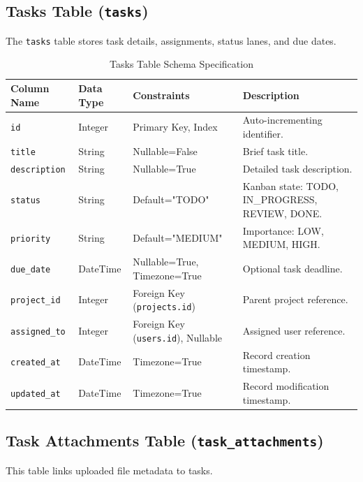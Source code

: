 \pagebreak
\subsection{Tasks Table (\texttt{tasks})}
The \texttt{tasks} table stores task details, assignments, status lanes, and due dates.

\begin{table}[h!]
\centering
\small
\renewcommand{\arraystretch}{1.4}
\begin{tabularx}{\textwidth}{l l l X}
    \toprule[1.5pt]
    \rowcolor{primary!5}
    \textbf{\color{primary}Column Name} & \textbf{\color{primary}Data Type} & \textbf{\color{primary}Constraints} & \textbf{\color{primary}Description} \\
    \midrule
    \texttt{id} & Integer & Primary Key, Index & Auto-incrementing identifier. \\
    \texttt{title} & String & Nullable=False & Brief task title. \\
    \texttt{description} & String & Nullable=True & Detailed task description. \\
    \texttt{status} & String & Default="TODO" & Kanban state: TODO, IN\_PROGRESS, REVIEW, DONE. \\
    \texttt{priority} & String & Default="MEDIUM" & Importance: LOW, MEDIUM, HIGH. \\
    \texttt{due\_date} & DateTime & Nullable=True, Timezone=True & Optional task deadline. \\
    \texttt{project\_id} & Integer & Foreign Key (\texttt{projects.id}) & Parent project reference. \\
    \texttt{assigned\_to} & Integer & Foreign Key (\texttt{users.id}), Nullable & Assigned user reference. \\
    \texttt{created\_at} & DateTime & Timezone=True & Record creation timestamp. \\
    \texttt{updated\_at} & DateTime & Timezone=True & Record modification timestamp. \\
    \bottomrule[1.5pt]
\end{tabularx}
\caption{Tasks Table Schema Specification}
\label{tab:tasks_table}
\end{table}

\subsection{Task Attachments Table (\texttt{task\_attachments})}
This table links uploaded file metadata to tasks.


